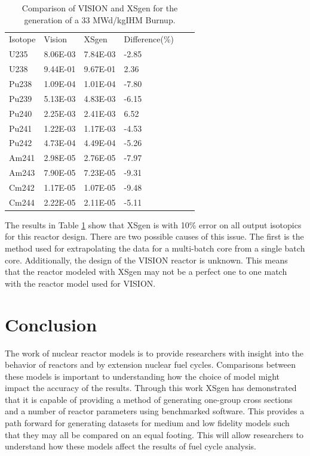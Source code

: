 \documentclass{article}
\begin{document}
\begin{table}[!htb]
\centering
\caption{Comparison of VISION and XSgen for the generation of a 33 MWd/kgIHM Burnup.}
\label{tab:recipe}
\begin{tabular}{llllll}
Isotope & Vision & XSgen & Difference(\%) \\
U235 & 8.06E-03 & 7.84E-03 & -2.85 \\
U238 & 9.44E-01 & 9.67E-01 & 2.36 \\
Pu238 & 1.09E-04 & 1.01E-04 & -7.80 \\
Pu239 & 5.13E-03 & 4.83E-03 & -6.15 \\
Pu240 & 2.25E-03 & 2.41E-03 & 6.52 \\
Pu241 & 1.22E-03 & 1.17E-03 & -4.53 \\ 
Pu242 & 4.73E-04 & 4.49E-04 & -5.26 \\
Am241 & 2.98E-05 & 2.76E-05 & -7.97 \\
Am243 & 7.90E-05 & 7.23E-05 & -9.31 \\
Cm242 & 1.17E-05 & 1.07E-05 & -9.48 \\
Cm244 & 2.22E-05 & 2.11E-05 & -5.11 \\
\end{tabular}
\end{table}

The results in Table \ref{tab:recipe} show that XSgen is with 10\% error on all output isotopics for this reactor design. There are two possible causes of this issue. The first is the method used for extrapolating the data for a multi-batch core from a single batch core. Additionally, the design of the VISION reactor is unknown. This means that the reactor modeled with XSgen may not be a perfect one to one match with the reactor model used for VISION.  

\section{Conclusion}
The work of nuclear reactor models is to provide researchers with insight into the behavior of reactors and by extension nuclear fuel cycles. Comparisons between these models is important to understanding how the choice of model might impact the accuracy of the results. Through this work XSgen has demonstrated that it is capable of providing a method of generating one-group cross sections and a number of reactor parameters using benchmarked software. This provides a path forward for generating datasets for medium and low fidelity models such that they may all be compared on an equal footing. This will allow researchers to understand how these models affect the results of fuel cycle analysis. 
\end{document}
